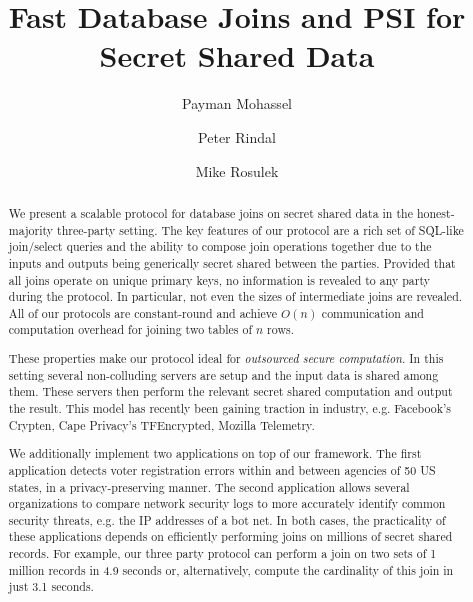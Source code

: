 \documentclass[sigconf]{acmart}
\begin{document}
\title{Fast Database Joins and PSI for Secret Shared Data}

\ifccs
\author{Payman Mohassel}

\author{Peter Rindal}

\author{Mike Rosulek}

\else
\maketitle
\fi

\begin{abstract}
We present a scalable protocol for database joins on secret shared data in the honest-majority three-party setting. The key features of our protocol are a rich set of SQL-like join/select queries and the ability to compose join operations together due to the inputs and outputs being generically secret shared between the parties. Provided that all joins operate on unique primary keys, no information is revealed to any party during the protocol. In particular, not even the sizes of intermediate joins are revealed. All of our protocols are constant-round and achieve $O(n)$ communication and computation overhead for joining two tables of $n$ rows. 

These properties make our protocol ideal for \emph{outsourced secure computation}. In this setting several non-colluding servers are setup and the input data is shared among them. These servers then perform the relevant secret shared computation and output the result. This model has recently been gaining traction in industry, e.g. Facebook's Crypten, Cape Privacy's TFEncrypted, Mozilla Telemetry.

We additionally implement two applications on top of our framework. The first application detects voter registration errors within and between agencies of 50 US states, in a privacy-preserving manner. The second application allows several organizations to compare network security logs to more accurately identify common security threats, e.g. the IP addresses of a bot net. In both cases, the practicality of these applications depends on efficiently performing joins on millions of secret shared records. For example, our three party protocol can perform a join on two sets of 1 million records in 4.9 seconds or, alternatively, compute the cardinality of this join in just 3.1 seconds. 
\end{abstract}
\end{document}
